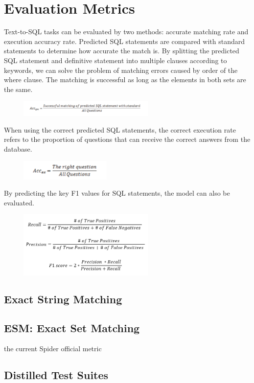 \section{Evaluation Metrics}

Text-to-SQL tasks can be evaluated by two methods: accurate matching rate and execution accuracy rate. Predicted SQL statements are compared with standard statements to determine how accurate the match is.
By splitting the predicted SQL statement and definitive statement into multiple clauses according to keywords, we can solve the problem of matching errors caused by order of the where clause. The matching is successful as long as the elements in both sets are the same.

\begin{figure}[htb]
    \centering
    \includegraphics[width=0.6\textwidth]{pics/acc1.png}
    \label{fig:acc1}
\end{figure}

When using the correct predicted SQL statements, the correct execution rate refers to the proportion of questions that can receive the correct answers from the database.

\begin{figure}[htb]
    \centering
    \includegraphics[width=0.4\textwidth]{pics/acc2.png}
    \label{fig:acc2}
\end{figure}

By predicting the key F1 values for SQL statements, the model can also be evaluated.

\begin{figure}[htb]
    \centering
    \includegraphics[width=0.6\textwidth]{pics/f1.png}
    \label{fig:f1}
\end{figure}

\subsection{Exact String Matching}
\subsection{ESM: Exact Set Matching}

the current Spider official metric

\subsection{Distilled Test Suites}
